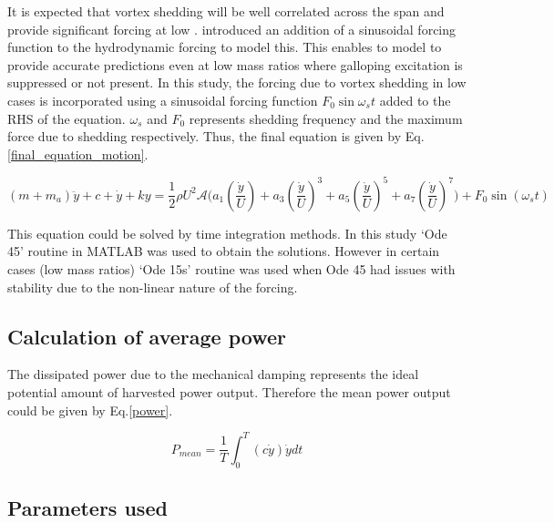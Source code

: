  It is expected that vortex shedding will be well correlated across the span and provide significant forcing at low \reynoldsnumber.\cite{Joly2012} introduced  an addition of a sinusoidal forcing function to the hydrodynamic forcing to model this. This enables to model to provide accurate predictions even at low mass ratios where galloping excitation is suppressed or not present. In this study, the forcing due to vortex shedding in low \reynoldsnumber cases is incorporated using a sinusoidal forcing function $F_0\sin{\omega_{s}t}$ added to the RHS of the equation. $\omega_{s}$ and $F_0$ represents shedding frequency and the maximum force due to shedding respectively. Thus, the final equation is given by Eq.\eqref{final_equation_motion}.    

\begin{equation}
\label{final_equation_motion}
(m{+}m_a)\ddot{y}{+}c{+}\dot{y}{+}ky{=}\frac{1}{2}\rho U^2 \mathcal  {A} \Bigg(a_1\left(\frac{\dot{y}}{U}\right){+}a_3\left(\frac{\dot{y}}{U}\right)^3{+}a_5\left(\frac{\dot{y}}{U}\right)^5{+}a_7\left(\frac{\dot{y}}{U}\right)^7 \Bigg){+} F_0\sin{(\omega_s t)}
\end{equation}

This equation could be solved by time integration methods. In  this study  `Ode 45' routine in MATLAB was used to obtain the solutions. However in certain cases (low mass ratios) `Ode 15s' routine was used when Ode 45 had issues with stability due to the non-linear nature of the forcing.

\subsection{Calculation of average power}

 The dissipated power due to the mechanical damping represents the ideal potential amount of harvested power output. Therefore the mean power output could be given by Eq.\eqref{power}. 
  
 
 \begin{equation}
 \label{power}
P_{mean}=\frac{1}{T}\int_{0}^{T}(c\dot{y})\dot{y} dt
 \end{equation}
 
 

 
 
\subsection{Parameters used} 
 
